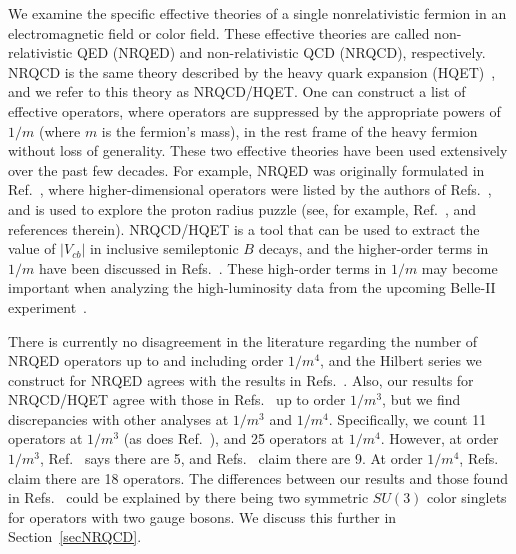 \documentclass[prd,onecolumn, nofootinbib, 11pt]{revtex4}
\begin{document}
We examine the specific effective theories of a single nonrelativistic fermion in an electromagnetic field or color field.  These effective theories are called non-relativistic QED (NRQED) and non-relativistic QCD (NRQCD), respectively.  
%
NRQCD is the same theory described by the heavy quark expansion (HQET)~\cite{Manohar:1997qy}, and we refer to this theory as NRQCD/HQET.  
%
One can construct a list of effective operators, where operators are suppressed by the appropriate powers of $1/m$ (where $m$ is the fermion's mass), in the rest frame of the heavy fermion without loss of generality. 
%
These two effective theories have been used extensively over the past few decades.  For example, NRQED was originally formulated in Ref.~\cite{Caswell:1985ui}, where higher-dimensional operators were listed by the authors of Refs.~\cite{Kinoshita:1995mt, Manohar:1997qy, Hill:2012rh}, and is used to explore the proton radius puzzle (see, for example, Ref.~\cite{Hill:2017wzi}, and references therein). 
%
NRQCD/HQET is a tool that can be used to extract the value of $|V_{cb}|$ in inclusive semileptonic $B$ decays, and the higher-order terms in $1/m$ have been discussed in Refs.~\cite{Mannel:1994kv, Manohar:1997qy, Mannel:2010wj, Gunawardana:2017zix}.  These high-order terms in $1/m$ may become important when analyzing the high-luminosity data from the upcoming Belle-II experiment~\cite{Gambino:2016jkc, Heinonen:2014dxa}. 




There is currently no disagreement in the literature regarding the number of NRQED operators up to and including order $1/m^4$, and the Hilbert series we construct for NRQED agrees with the results in Refs.~\cite{Caswell:1985ui, Kinoshita:1995mt, Manohar:1997qy, Hill:2012rh}.  
%
Also, our results for NRQCD/HQET agree with those in Refs.~\cite{Mannel:1994kv, Manohar:1997qy} up to order $1/m^3$, but we find discrepancies with other analyses at $1/m^3$ and $1/m^4$.  
Specifically, we count 11 operators at $1/m^3$ (as does Ref.~\cite{Manohar:1997qy}), and 25 operators at $1/m^4$.  
However, at order $1/m^3$, Ref.~\cite{Dassinger:2006md} says there are 5, and Refs.~\cite{Mannel:2010wj, Gunawardana:2017zix} claim there are 9.  At order $1/m^4$, Refs.~\cite{Mannel:2010wj, Gunawardana:2017zix} claim there are 18 operators.  
%
The differences between our results and those found in Refs.~\cite{Mannel:2010wj, Gunawardana:2017zix} could be explained by there being two symmetric $SU(3)$ color singlets for operators with two gauge bosons.  
We discuss this further in Section~\ref{secNRQCD}.  
\end{document}
